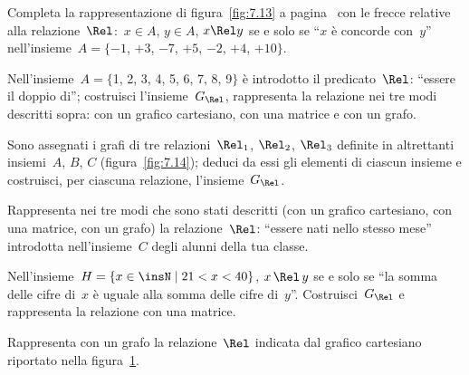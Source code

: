 \begin{esercizio}
\label{ese:7.12}
Completa la rappresentazione di figura~\ref{fig:7.13} a pagina~\pageref{fig:7.13} con le frecce relative alla relazione~$\Rel$:~$x \in A$, $y \in A$, $x \Rel y$ se e solo se ``$x$ è concorde con~$y$''
nell'insieme~$A =\{-1$, $+3$, $-7$, $+5$, $-2$, $+4$, $+10\}$.
\end{esercizio}

\begin{esercizio}
\label{ese:7.13}
Nell'insieme~$A = \{$1, 2, 3, 4, 5, 6, 7, 8, 9$\}$ è introdotto il predicato~$\Rel$: ``essere il
doppio di''; costruisci l'insieme~$G_\Rel$, rappresenta la relazione nei tre modi descritti sopra: con un grafico cartesiano,
con una matrice e con un grafo.
\end{esercizio}

\begin{esercizio}
\label{ese:7.14}
Sono assegnati i grafi di tre relazioni~$\Rel_1$, $\Rel_2$, $\Rel_3$ definite in altrettanti insiemi~$A$, $B$, $C$ (figura~\ref{fig:7.14}); deduci da essi gli elementi di ciascun
insieme e costruisci, per ciascuna relazione, l'insieme~$G_\Rel$.
\end{esercizio}

\begin{esercizio}
\label{ese:7.15}
Rappresenta nei tre modi che sono stati descritti (con un grafico cartesiano, con una matrice, con un
grafo) la relazione~$\Rel$: ``essere nati nello stesso mese'' introdotta nell'insieme~$C$ degli alunni della tua classe.
\end{esercizio}

\begin{esercizio}
\label{ese:7.16}
Nell'insieme~$H = \{ x \in \insN \mid  21 < x < 40 \}$, $x \,\Rel\, y$ se e solo se ``la somma delle cifre di~$x$ è uguale alla somma delle cifre di~$y$''.
Costruisci~$G_\Rel$ e rappresenta la relazione con una matrice.
\end{esercizio}

\begin{esercizio}
\label{ese:7.17}
Rappresenta con un grafo la relazione~$\Rel$ indicata dal grafico cartesiano riportato nella figura~\ref{fig:7.15}.
\end{esercizio}

\begin{figure}[b]
\begin{minipage}[b]{.69\textwidth}
 \centering
 
 \caption{}\label{fig:7.14}
\end{minipage}\
\begin{minipage}[b]{.3\textwidth}
 \centering
 
 \caption{}\label{fig:7.15}
\end{minipage}
\end{figure}


